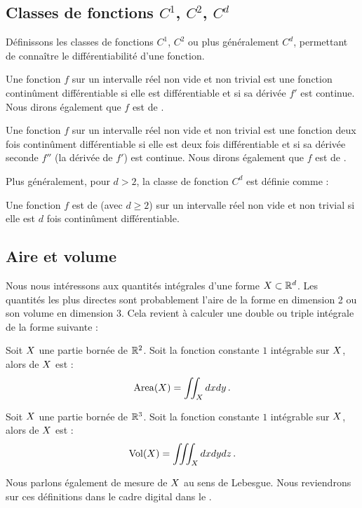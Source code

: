 \subsection{Classes de fonctions $C^1$, $C^2$, $C^d$}
%
Définissons les classes de fonctions $C^1$, $C^2$ ou plus généralement
$C^d$, permettant de connaître le différentiabilité d'une fonction.
%
\begin{definition}{}
  Une fonction $f$ sur un intervalle réel non vide et non trivial est une
  fonction continûment différentiable si elle est différentiable et si sa
  dérivée $f'$ est continue. Nous dirons également que $f$ est de
  .
\end{definition}
%
\begin{definition}{}
  Une fonction $f$ sur un intervalle réel non vide et non trivial est une
  fonction deux fois continûment différentiable si elle est deux fois
  différentiable et si sa dérivée seconde $f''$ (la dérivée de $f'$) est
  continue. Nous dirons également que $f$ est de .
\end{definition}
%
Plus généralement, pour $d>2$, la classe de fonction $C^d$ est définie comme :
%
\begin{definition}{}
  Une fonction $f$ est de  (avec $d \ge 2$) sur un
  intervalle réel non vide et non trivial si elle est $d$ fois continûment
  différentiable.
\end{definition}
%
\subsection{Aire et volume}
%
Nous nous intéressons aux quantités intégrales d'une forme $X \subset
\mathbb{R}^d$. Les quantités les plus directes sont probablement l'aire de la forme en
dimension 2 ou son volume en dimension 3. Cela revient à calculer une double ou
triple intégrale de la forme suivante :
%
\begin{definition}{}
  Soit $X$ une partie bornée de $\mathbb{R}^2$. Soit la fonction constante $1$
  intégrable sur $X$, alors  de $X$ est :
  \begin{equation}
    \label{eq:aire}
    \mathrm{Area}(X) = \iint_{X} dxdy \,.
  \end{equation}
\end{definition}
%
\begin{definition}{}
  Soit $X$ une partie bornée de $\mathbb{R}^3$. Soit la fonction constante $1$
  intégrable sur $X$, alors  de $X$ est :
  \begin{equation}
    \label{eq:volume}
    \mathrm{Vol}(X) = \iiint_{X} dxdydz \,.
  \end{equation}
\end{definition}
%
Nous parlons également de mesure de $X$ au sens de Lebesgue. Nous
reviendrons sur ces définitions dans le cadre digital dans le .
%
